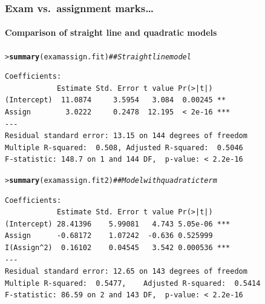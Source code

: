 \documentclass{beamer}\usepackage[]{graphicx}\usepackage[]{xcolor}
\makeatletter
\newcommand{\hlcom}[1]{\textcolor[rgb]{0.678,0.584,0.686}{\textit{#1}}}%
\newcommand{\hlstd}[1]{\textcolor[rgb]{0.345,0.345,0.345}{#1}}%
\newcommand{\hlkwd}[1]{\textcolor[rgb]{0.737,0.353,0.396}{\textbf{#1}}}%
\newenvironment{kframe}{%
 \def\at@end@of@kframe{}%
 \ifinner\ifhmode%
  \def\at@end@of@kframe{\end{minipage}}%
  \begin{minipage}{\columnwidth}%
 \fi\fi%
 \def\FrameCommand##1{\hskip\@totalleftmargin \hskip-\fboxsep
 \colorbox{shadecolor}{##1}\hskip-\fboxsep
     \hskip-\linewidth \hskip-\@totalleftmargin \hskip\columnwidth}%
 \MakeFramed {\advance\hsize-\width
   \@totalleftmargin\z@ \linewidth\hsize
   \@setminipage}}%
 {\par\unskip\endMakeFramed%
 \at@end@of@kframe}
\newenvironment{knitrout}{}{} %
\makeatother
\begin{document}
\begin{frame}[ fragile]
\frametitle{Exam vs.\ assignment marks\ldots}
\framesubtitle{Comparison of straight line and quadratic models}

\begin{small}
\begin{knitrout}\scriptsize
{}\color{fgcolor}\begin{kframe}
\begin{alltt}
\hlstd{> }\hlkwd{summary}\hlstd{(examassign.fit)}   \hlcom{## Straight line model}
\end{alltt}
\end{kframe}
\end{knitrout}

\begin{knitrout}\scriptsize
{}\color{fgcolor}\begin{kframe}
\begin{verbatim}
Coefficients:
            Estimate Std. Error t value Pr(>|t|)    
(Intercept)  11.0874     3.5954   3.084  0.00245 ** 
Assign        3.0222     0.2478  12.195  < 2e-16 ***
---
Residual standard error: 13.15 on 144 degrees of freedom
Multiple R-squared:  0.508,	Adjusted R-squared:  0.5046 
F-statistic: 148.7 on 1 and 144 DF,  p-value: < 2.2e-16
\end{verbatim}
\end{kframe}
\end{knitrout}

\begin{knitrout}\scriptsize
{}\color{fgcolor}\begin{kframe}
\begin{alltt}
\hlstd{> }\hlkwd{summary}\hlstd{(examassign.fit2)}  \hlcom{## Model with quadratic term}
\end{alltt}
\end{kframe}
\end{knitrout}

\begin{knitrout}\scriptsize
{}\color{fgcolor}\begin{kframe}
\begin{verbatim}
Coefficients:
            Estimate Std. Error t value Pr(>|t|)    
(Intercept) 28.41396    5.99081   4.743 5.05e-06 ***
Assign      -0.68172    1.07242  -0.636 0.525999    
I(Assign^2)  0.16102    0.04545   3.542 0.000536 ***
---
Residual standard error: 12.65 on 143 degrees of freedom
Multiple R-squared:  0.5477,	Adjusted R-squared:  0.5414 
F-statistic: 86.59 on 2 and 143 DF,  p-value: < 2.2e-16
\end{verbatim}
\end{kframe}
\end{knitrout}
\end{small}
\end{frame}
\end{document}

